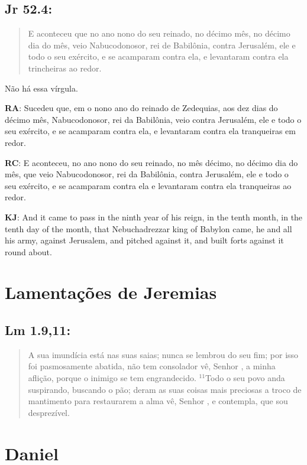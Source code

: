 \subsection*{Jr 52.4:} 
 \begin{quote}
  \small
E aconteceu\uwave{,} que no ano nono do seu reinado, no décimo mês, no décimo dia do mês, veio Nabucodonosor, rei de Babilônia, contra Jerusalém, ele e todo o seu exército, e se acamparam contra ela, e levantaram contra ela trincheiras ao redor.
 \end{quote}

Não há essa vírgula.

\textbf{RA}: Sucedeu que, em o nono ano do reinado de Zedequias, aos dez dias do décimo mês, Nabucodonosor, rei da Babilônia, veio contra Jerusalém, ele e todo o seu exército, e se acamparam contra ela, e levantaram contra ela tranqueiras em redor.

\textbf{RC}: E aconteceu, no ano nono do seu reinado, no mês décimo, no décimo dia do mês, que veio Nabucodonosor, rei da Babilônia, contra Jerusalém, ele e todo o seu exército, e se acamparam contra ela e levantaram contra ela tranqueiras ao redor.

\textbf{KJ}: And it came to pass in the ninth year of his reign, in the tenth month, in the tenth day of the month, that Nebuchadrezzar king of Babylon came, he and all his army, against Jerusalem, and pitched against it, and built forts against it round about.

\section{Lamentações de Jeremias}
\subsection*{Lm 1.9,11:} 
 \begin{quote} 
  \small
A sua imundícia está nas suas saias; nunca se lembrou do seu fim; por isso foi pasmosamente abatida, não tem consolador\uwave{;} vê, Senhor , a minha aflição, porque o inimigo se tem engrandecido. $^{\mathrm{11}}$Todo o seu povo anda suspirando, buscando o pão; deram as suas coisas mais preciosas a troco de mantimento para restaurarem a alma\uwave{;} vê, Senhor , e contempla, que sou desprezível.
 \end{quote}

\section{Daniel}
